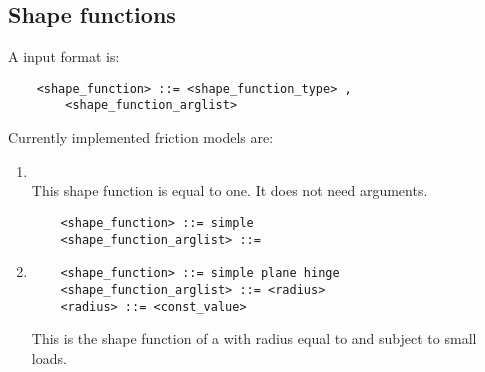 \subsection{Shape functions}
A  input format is:
\begin{verbatim}
    <shape_function> ::= <shape_function_type> ,
        <shape_function_arglist>
\end{verbatim}
Currently implemented friction models are:
\begin{enumerate}
    \item {}\\
    This shape function is equal to one. It does not need arguments.
    \begin{verbatim}
    <shape_function> ::= simple
    <shape_function_arglist> ::=
    \end{verbatim}
    \item {}
    \begin{verbatim}
    <shape_function> ::= simple plane hinge
    <shape_function_arglist> ::= <radius>
    <radius> ::= <const_value>
    \end{verbatim}
    This is the shape function of a  with radius equal to 
     and subject to small loads.
\end{enumerate}
